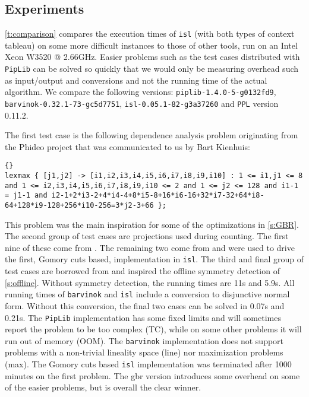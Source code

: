 \subsection{Experiments}

\autoref{t:comparison} compares the execution times of {\tt isl}
(with both types of context tableau)
on some more difficult instances to those of other tools,
run on an Intel Xeon W3520 @ 2.66GHz.
Easier problems such as the
test cases distributed with {\tt Pip\-Lib} can be solved so quickly
that we would only be measuring overhead such as input/output and conversions
and not the running time of the actual algorithm.
We compare the following versions:
{\tt piplib-1.4.0-5-g0132fd9},
{\tt barvinok-0.32.1-73-gc5d7751},
{\tt isl-0.05.1-82-g3a37260}
and {\tt PPL} version 0.11.2.

The first test case is the following dependence analysis problem
originating from the Phideo project \parencite{Verhaegh1995PhD}
that was communicated to us by Bart Kienhuis:
\begin{lstlisting}[flexiblecolumns=true,breaklines=true]{}
lexmax { [j1,j2] -> [i1,i2,i3,i4,i5,i6,i7,i8,i9,i10] : 1 <= i1,j1 <= 8 and 1 <= i2,i3,i4,i5,i6,i7,i8,i9,i10 <= 2 and 1 <= j2 <= 128 and i1-1 = j1-1 and i2-1+2*i3-2+4*i4-4+8*i5-8+16*i6-16+32*i7-32+64*i8-64+128*i9-128+256*i10-256=3*j2-3+66 };
\end{lstlisting}
This problem was the main inspiration
for some of the optimizations in \autoref{s:GBR}.
The second group of test cases are projections used during counting.
The first nine of these come from \textcite{Seghir2006minimizing}.
The remaining two come from \textcite{Verdoolaege2005experiences} and
were used to drive the first, Gomory cuts based, implementation
in {\tt isl}.
The third and final group of test cases are borrowed from
\textcite{Bygde2010licentiate} and inspired the offline symmetry detection
of \autoref{s:offline}.  Without symmetry detection, the running times
are 11s and 5.9s.
All running times of {\tt barvinok} and {\tt isl} include a conversion
to disjunctive normal form.  Without this conversion, the final two
cases can be solved in 0.07s and 0.21s.
The {\tt PipLib} implementation has some fixed limits and will
sometimes report the problem to be too complex (TC), while on some other
problems it will run out of memory (OOM).
The {\tt barvinok} implementation does not support problems
with a non-trivial lineality space (line) nor maximization problems (max).
The Gomory cuts based {\tt isl} implementation was terminated after 1000
minutes on the first problem.  The gbr version introduces some
overhead on some of the easier problems, but is overall the clear winner.

